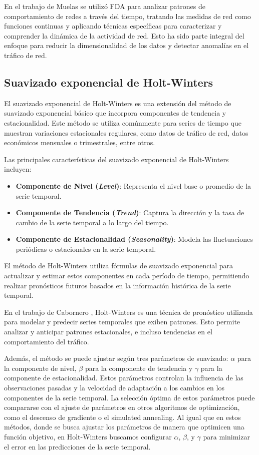 En el trabajo de Muelas \cite{muelas2015} se utilizó FDA para analizar patrones de comportamiento de redes a través del tiempo, tratando las medidas de red como funciones continuas y aplicando técnicas específicas para caracterizar y comprender la dinámica de la actividad de red. Esto ha sido parte integral del enfoque para reducir la dimensionalidad de los datos y detectar anomalías en el tráfico de red.

\subsection{Suavizado exponencial de Holt-Winters} %
El suavizado exponencial de Holt-Winters es una extensión del método de suavizado exponencial básico que incorpora componentes de tendencia y estacionalidad. Este método se utiliza comúnmente para series de tiempo que muestran variaciones estacionales regulares, como datos de tráfico de red, datos económicos mensuales o trimestrales, entre otros.

Las principales características del suavizado exponencial de Holt-Winters incluyen:
\begin{itemize}
    \item \textbf{Componente de Nivel (\textit{Level})}: Representa el nivel base o promedio de la serie temporal.
    \item \textbf{Componente de Tendencia (\textit{Trend})}: Captura la dirección y la tasa de cambio de la serie temporal a lo largo del tiempo.
    \item \textbf{Componente de Estacionalidad (\textit{Seasonality})}: Modela las fluctuaciones periódicas o estacionales en la serie temporal.
\end{itemize}
El método de Holt-Winters utiliza fórmulas de suavizado exponencial para actualizar y estimar estos componentes en cada período de tiempo, permitiendo realizar pronósticos futuros basados en la información histórica de la serie temporal. 

En el trabajo de Cabornero \cite{cabornero2021}, Holt-Winters es una técnica de pronóstico utilizada para modelar y predecir series temporales que exiben patrones. Esto permite analizar y anticipar patrones estacionales, e incluso tendencias en el comportamiento del tráfico.

Además, el método se puede ajustar según tres parámetros de suavizado: $\alpha$ para la componente de nivel, $\beta$ para la componente de tendencia y $\gamma$ para la componente de estacionalidad. Estos parámetros controlan la influencia de las observaciones pasadas y la velocidad de adaptación a los cambios en los componentes de la serie temporal. La selección óptima de estos parámetros puede compararse con el ajuste de parámetros en otros algoritmos de optimización, como el descenso de gradiente o el simulated annealing. Al igual que en estos métodos, donde se busca ajustar los parámetros de manera que optimicen una función objetivo, en Holt-Winters buscamos configurar $\alpha$, $\beta$, y $\gamma$ para minimizar el error en las predicciones de la serie temporal.

